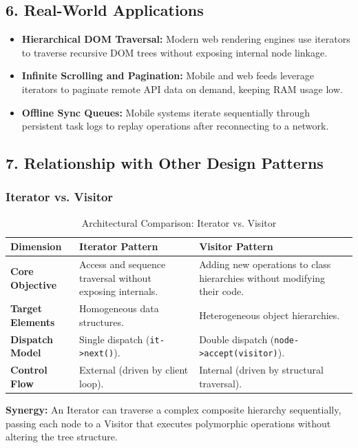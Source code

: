 \subsection{6. Real-World Applications}
\begin{itemize}
    \item \textbf{Hierarchical DOM Traversal:} Modern web rendering engines use iterators to traverse recursive DOM trees without exposing internal node linkage.
    \item \textbf{Infinite Scrolling and Pagination:} Mobile and web feeds leverage iterators to paginate remote API data on demand, keeping RAM usage low.
    \item \textbf{Offline Sync Queues:} Mobile systems iterate sequentially through persistent task logs to replay operations after reconnecting to a network.
\end{itemize}

\subsection{7. Relationship with Other Design Patterns}

\subsubsection{Iterator vs. Visitor}
\begin{table}[htbp]
\centering
\caption{Architectural Comparison: Iterator vs. Visitor}
\begin{tabular}{@{}p{3.5cm} p{5.5cm} p{5.5cm}@{}}
\toprule
\textbf{Dimension} & \textbf{Iterator Pattern} & \textbf{Visitor Pattern} \\ \midrule
\textbf{Core Objective} & Access and sequence traversal without exposing internals. & Adding new operations to class hierarchies without modifying their code. \\ \midrule
\textbf{Target Elements} & Homogeneous data structures. & Heterogeneous object hierarchies. \\ \midrule
\textbf{Dispatch Model} & Single dispatch (\texttt{it->next()}). & Double dispatch (\texttt{node->accept(visitor)}). \\ \midrule
\textbf{Control Flow} & External (driven by client loop). & Internal (driven by structural traversal). \\ \bottomrule
\end{tabular}
\end{table}

\noindent \textbf{Synergy:} An Iterator can traverse a complex composite hierarchy sequentially, passing each node to a Visitor that executes polymorphic operations without altering the tree structure.

